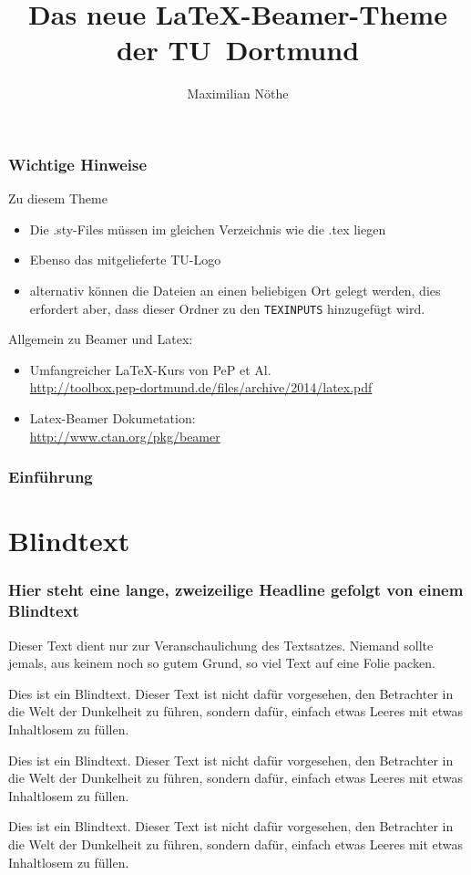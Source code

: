 \documentclass[9pt]{beamer}
\title{Das neue \LaTeX-Beamer-Theme der TU~Dortmund}
\author{Maximilian Nöthe}
\institute{Names des Lehrstuhls \\[0.5em] Name der Fakultät}
\begin{document}
\begin{frame}
  \setcounter{framenumber}{0}
  \titlepage
\end{frame}

\begin{frame}
  \frametitle{Wichtige Hinweise}
  Zu diesem Theme
  \begin{itemize}
    \item Die .sty-Files müssen im gleichen Verzeichnis wie die .tex liegen
    \item Ebenso das mitgelieferte TU-Logo
    \item alternativ können die Dateien an einen beliebigen Ort gelegt werden,
    dies erfordert aber, dass dieser Ordner zu den \texttt{TEXINPUTS} hinzugefügt wird.
  \end{itemize}
  Allgemein zu Beamer und Latex:
  \begin{itemize}
    \item Umfangreicher \LaTeX-Kurs von PeP et Al. \\
    \url{http://toolbox.pep-dortmund.de/files/archive/2014/latex.pdf}
    \item Latex-Beamer Dokumetation:\\
    \url{http://www.ctan.org/pkg/beamer}
  \end{itemize}
\end{frame}

\begin{frame}
    \frametitle{Einführung}
    \tableofcontents[pausesections]
\end{frame}

\section{Blindtext}
\begin{frame}
	\frametitle{Hier steht eine lange, zweizeilige Headline
		\newline gefolgt von einem Blindtext}
Dieser Text dient nur zur Veranschaulichung des Textsatzes. Niemand sollte jemals, aus keinem noch so gutem Grund, so viel Text auf eine Folie packen.

Dies ist ein Blindtext. Dieser Text ist nicht dafür vorgesehen, den Betrachter in die Welt der Dunkelheit zu führen, sondern dafür, einfach etwas Leeres mit etwas Inhaltlosem zu füllen.

Dies ist ein Blindtext. Dieser Text ist nicht dafür vorgesehen, den Betrachter in die Welt der Dunkelheit zu führen, sondern dafür, einfach etwas Leeres mit etwas Inhaltlosem zu füllen.

Dies ist ein Blindtext. Dieser Text ist nicht dafür vorgesehen, den Betrachter in die Welt der Dunkelheit zu führen, sondern dafür, einfach etwas Leeres mit etwas Inhaltlosem zu füllen.

\end{frame}
\end{document}
